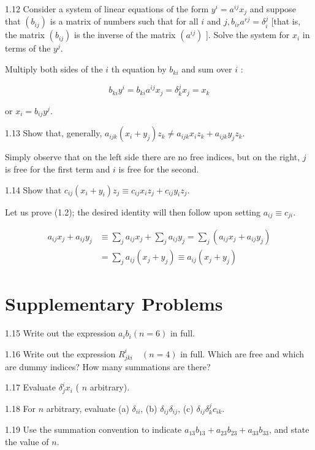 \documentclass[10pt]{article}
\begin{document}
1.12 Consider a system of linear equations of the form $y^{i}=a^{i j} x_{j}$ and suppose that $\left(b_{i j}\right)$ is a matrix of numbers such that for all $i$ and $j, b_{i r} a^{r j}=\delta_{i}^{j}$ [that is, the matrix $\left(b_{i j}\right)$ is the inverse of the matrix $\left(a^{i j}\right)$ ]. Solve the system for $x_{i}$ in terms of the $y^{j}$.

Multiply both sides of the $i$ th equation by $b_{k i}$ and sum over $i$ :

$$
b_{k i} y^{i}=b_{k i} a^{i j} x_{j}=\delta_{k}^{j} x_{j}=x_{k}
$$

or $x_{i}=b_{i j} y^{j}$.

1.13 Show that, generally, $a_{i j k}\left(x_{i}+y_{j}\right) z_{k} \neq a_{i j k} x_{i} z_{k}+a_{i j k} y_{j} z_{k}$.

Simply observe that on the left side there are no free indices, but on the right, $j$ is free for the first term and $i$ is free for the second.

1.14 Show that $c_{i j}\left(x_{i}+y_{i}\right) z_{j} \equiv c_{i j} x_{i} z_{j}+c_{i j} y_{i} z_{j}$.

Let us prove (1.2); the desired identity will then follow upon setting $a_{i j} \equiv c_{j i}$.

$$
\begin{aligned}
a_{i j} x_{j}+a_{i j} y_{j} & \equiv \sum_{j} a_{i j} x_{j}+\sum_{j} a_{i j} y_{j}=\sum_{j}\left(a_{i j} x_{j}+a_{i j} y_{j}\right) \\
& =\sum_{j} a_{i j}\left(x_{j}+y_{j}\right) \equiv a_{i j}\left(x_{j}+y_{j}\right)
\end{aligned}
$$

\section*{Supplementary Problems}
1.15 Write out the expression $a_{i} b_{i}(n=6)$ in full.

1.16 Write out the expression $R_{j k i}^{i} \quad(n=4)$ in full. Which are free and which are dummy indices? How many summations are there?

1.17 Evaluate $\delta_{j}^{i} x_{i}$ ( $n$ arbitrary).

1.18 For $n$ arbitrary, evaluate (a) $\delta_{i i}$, (b) $\delta_{i j} \delta_{i j}$, (c) $\delta_{i j} \delta_{k}^{j} c_{i k}$.

1.19 Use the summation convention to indicate $a_{13} b_{13}+a_{23} b_{23}+a_{33} b_{33}$, and state the value of $n$.
\end{document}
